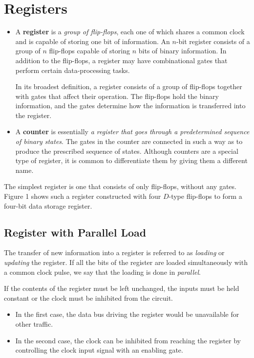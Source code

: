\section{Registers}
\label{sec:registers}

\begin{itemize}[leftmargin=0.7cm]
  \item A \textbf{register} is a \textit{group of flip-flops}, each one of which shares a common clock and is capable of storing one bit of information. An $n$-bit register consists of a group of $n$ flip-flops capable of storing $n$ bits of binary information. In addition to the flip-flops, a register may have combinational gates that perform certain data-processing tasks. 

  In its broadest definition, a register consists of a group of flip-flops together with gates that affect their operation. The flip-flops hold the binary information, and the gates determine how the information is transferred into the register.

  \item A \textbf{counter} is essentially \textit{a register that goes through a predetermined sequence of binary states}. The gates in the counter are connected in such a way as to produce the prescribed sequence of states. Although counters are a special type of register, it is common to differentiate them by giving them a different name.
\end{itemize}

\noindent The simplest register is one that consists of only flip-flops, without any gates. Figure 1 shows such a register constructed with four $D$-type flip-flops to form a four-bit data storage register.


\subsection{Register with Parallel Load}
\label{subsec:register-with-parallel-load}

The transfer of new information into a register is referred to as \textit{loading} or \textit{updating} the register. If all the bits of the register are loaded simultaneously with a common clock pulse, we say that the loading is done in \textit{parallel}.

If the contents of the register must be left unchanged, the inputs must be held constant or the clock must be inhibited from the circuit.
\begin{itemize}[leftmargin=0.7cm]
  \item In the first case, the data bus driving the register would be unavailable for other traffic.
  \item In the second case, the clock can be inhibited from reaching the register by controlling the clock input signal with an enabling gate.
\end{itemize}

